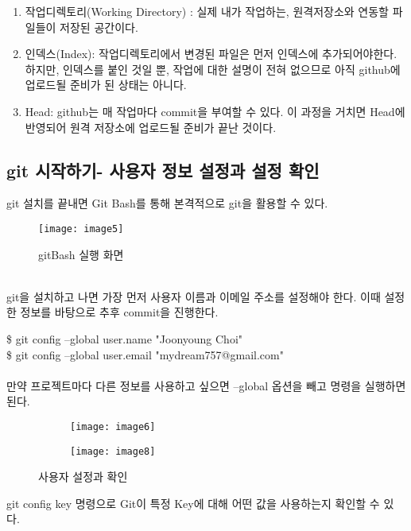 \documentclass[titlepage]{article}
\begin{document}
		\begin{enumerate}
			\item 작업디렉토리(Working Directory) : 실제 내가 작업하는, 원격저장소와 연동할 파일들이 저장된 공간이다.
			\item 인덱스(Index): 작업디렉토리에서 변경된 파일은 먼저 인덱스에 추가되어야한다. 하지만, 인덱스를
붙인 것일 뿐, 작업에 대한 설명이 전혀 없으므로 아직 github에 업로드될 준비가 된 상태는 아니다.
			\item Head: github는 매 작업마다 commit을 부여할 수 있다. 이 과정을 거치면 Head에 반영되어 
원격 저장소에 업로드될 준비가 끝난 것이다.
		\end{enumerate}
		\newpage
		\subsection{ git 시작하기- 사용자 정보 설정과 설정 확인}
		git 설치를 끝내면 Git Bash를 통해 본격적으로 git을 활용할 수 있다. \\
		\begin{figure}[h]
		\texttt{[image: image5]}
		\caption{gitBash 실행 화면}
		\label{fig:figure3}
		\end{figure}
		\\
		git을 설치하고 나면 가장 먼저 사용자 이름과 이메일 주소를 설정해야 한다. 이때 설정한 정보를 바탕으로 추후 commit을 진행한다.\\

\par
\noindent\$ git config --global user.name "Joonyoung Choi"\\
\$ git config --global user.email "mydream757@gmail.com"
\\\\
 만약 프로젝트마다 다른 정보를 사용하고 싶으면 --global 옵션을 빼고 명령을 실행하면 된다.\\
 		\begin{figure}[h]
 
		\begin{subfigure}{0.5\textwidth}
		\texttt{[image: image6]} 
		\end{subfigure}
		\begin{subfigure}{0.5\textwidth}
		\texttt{[image: image8]}
		
	
		\end{subfigure}
 
		\caption{사용자 설정과 확인}
		\label{fig:figure4}
		\end{figure}
	\par
\noindent git config {key} 명령으로 Git이 특정 Key에 대해 어떤 값을 사용하는지 확인할 수 있다.\\
\end{document}
